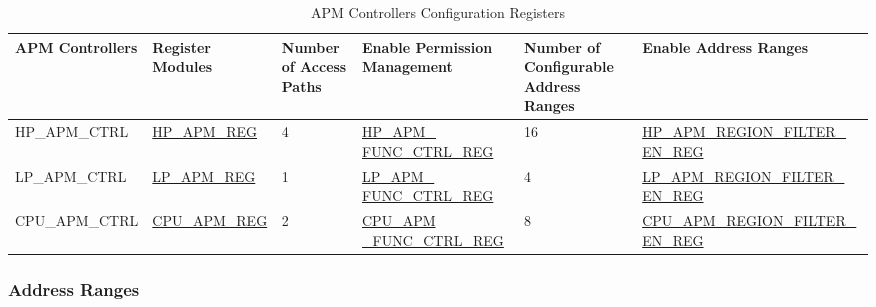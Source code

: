 \documentclass[main\_\_EN.tex]{subfiles}
\begin{document}
\begin{footnotesize}
\begin{longtable}[C]{|L{2cm}|l|L{1.7cm}|L{2.8cm}|L{2.3cm}|L{3.5cm}|}
    \caption{APM Controllers Configuration Registers}
    \label{tab:apm-reg}\\\hline
    \textbf{APM Controllers} & \textbf{Register Modules} & \textbf{Number of Access Paths} & \textbf{Enable Permission Management} & \textbf{Number of Configurable Address Ranges} & \textbf{Enable Address Ranges}\\ \hline
    \endfirsthead
    \endlastfoot

   HP\_APM\_CTRL & \hyperref[sec:permctrl-reg-hp]{HP\_APM\_REG} &  4 &\hyperref[regdesc:HPAPMFUNCCTRLREG]{HP\_APM\_ FUNC\_CTRL\_REG} & 16 & \hyperref[fielddesc:HPAPMREGIONFILTEREN]{HP\_APM\_REGION\_FILTER\_ EN\_REG}\\ \hline

   LP\_APM\_CTRL & \hyperref[sec:permctrl-reg-lp]{LP\_APM\_REG} & 1 & \hyperref[regdesc:LPAPMFUNCCTRLREG]{LP\_APM\_ FUNC\_CTRL\_REG} & 4 & \hyperref[fielddesc:LPAPMREGIONFILTEREN]{LP\_APM\_REGION\_FILTER\_ EN\_REG}\\ \hline

    CPU\_APM\_CTRL & \hyperref[sec:permctrl-reg-cpu]{CPU\_APM\_REG} &  2 & \hyperref[regdesc:CPUAPMFUNCCTRLREG]{CPU\_APM \_FUNC\_CTRL\_REG} & 8 &\hyperref[fielddesc:CPUAPMREGIONFILTEREN]{CPU\_APM\_REGION\_FILTER\_ EN\_REG}\\ \hline
\end{longtable}
\end{footnotesize}

\subsubsection{Address Ranges}
\end{document}
